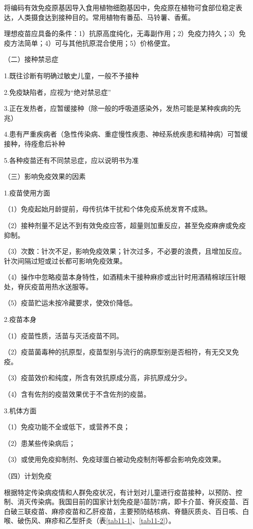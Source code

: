 将编码有效免疫原基因导入食用植物细胞基因中，免疫原在植物可食部位稳定表达，人类摄食达到接种目的。常用植物有番茄、马铃薯、香蕉。

理想疫苗应具备的条件：1）抗原高度纯化，无毒副作用；2）免疫力持久；3）免疫方法简单；4）可与其他抗原混合使用；5）价格便宜。

（二）接种禁忌症

1.既往诊断有明确过敏史儿童，一般不予接种

2.免疫缺陷者，应视为“绝对禁忌症”

3.正在发热者，应暂缓接种（除一般的呼吸道感染外，发热可能是某种疾病的先兆）

4.患有严重疾病者（急性传染病、重症慢性疾患、神经系统疾患和精神病）可暂缓接种，待痊愈后补种

5.各种疫苗还有不同禁忌症，应以说明书为准

（三）影响免疫效果的因素

1.疫苗使用方面

（1）免疫起始月龄提前，母传抗体干扰和个体免疫系统发育不成熟。

（2）接种剂量不足达不到有效免疫应答，超量则加重反应，甚至免疫麻痹或免疫抑制。

（3）次数：针次不足，影响免疫效果；针次过多，不必要的浪费，且增加反应。针次间隔过短或过长都可影响免疫效果。

（4）操作中忽略疫苗本身特性，如酒精未干接种麻疹或出针时用酒精棉球压针眼处，脊灰疫苗用热水送服等。

（5）疫苗贮运未按冷藏要求，使效价降低。

2.疫苗本身

（1）疫苗性质，活苗与灭活疫苗不同。

（2）疫苗菌毒种的抗原型，疫苗型别与流行的病原型别是否相符，有无交叉免疫。

（3）疫苗效价和纯度，所含有效抗原成分高，非抗原成分少。

（4）含有佐剂的疫苗效果优于不含佐剂的疫苗。

3.机体方面

（1）免疫功能不全或低下，或营养不良；

（2）患某些传染病后；

（3）或使用免疫抑制剂、免疫球蛋白被动免疫制剂等都会影响免疫效果。

（四）计划免疫

根据特定传染病疫情和人群免疫状况，有计划对儿童进行疫苗接种，以预防、控制、消灭传染病。我国目前的国家计划免疫是5苗防7病，即卡介苗、脊灰疫苗、百白破三联疫苗、麻疹疫苗和乙肝疫苗，主要预防结核病、脊髓灰质炎、百日咳、白喉、破伤风、麻疹和乙型肝炎（表\ref{tab11-1}、\ref{tab11-2}）。

